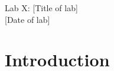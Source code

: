 \documentclass[11pt]{article}
\begin{document}
\begin{center}
\huge{Lab X: [Title of lab]}\\ \medskip \Large{[Date of lab]}
\end{center}


\section{Introduction}


\bigskip
\end{document}
